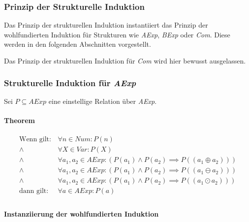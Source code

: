 			\subsubsection{Prinzip der Strukturelle Induktion}
				Das Prinzip der strukturellen Induktion instantiiert das Prinzip der wohlfundierten Induktion für Strukturen wie \textit{AExp}, \textit{BExp} oder \textit{Com}. Diese werden in den folgenden Abschnitten vorgestellt.

				Das Prinzip der strukturellen Induktion für \textit{Com} wird hier bewusst ausgelassen.

			\subsubsection{Strukturelle Induktion für \textit{AExp}}
				Sei $ P \subseteq \textit{AExp} $ eine einstellige Relation über \textit{AExp}.

				\paragraph{Theorem}
					\begin{align*}
						\text{Wenn gilt:} & \,\forall n \in \textit{Num} : P(n)                                                                    \\
						\land             & \,\forall X \in \textit{Var} : P(X)                                                                    \\
						\land             & \,\forall a _ 1, a _ 2 \in \textit{AExp} : (P(a _ 1) \land P(a _ 2) \implies P((a _ 1 \oplus a _ 2)))  \\
						\land             & \,\forall a _ 1, a _ 2 \in \textit{AExp} : (P(a _ 1) \land P(a _ 2) \implies P((a _ 1 \ominus a _ 2))) \\
						\land             & \,\forall a _ 1, a _ 2 \in \textit{AExp} : (P(a _ 1) \land P(a _ 2) \implies P((a _ 1 \odot a _ 2)))   \\
						\text{dann gilt:} & \,\forall a \in \textit{AExp} : P(a)                                                                   \\
					\end{align*}

				\paragraph{Instanziierung der wohlfundierten Induktion}

